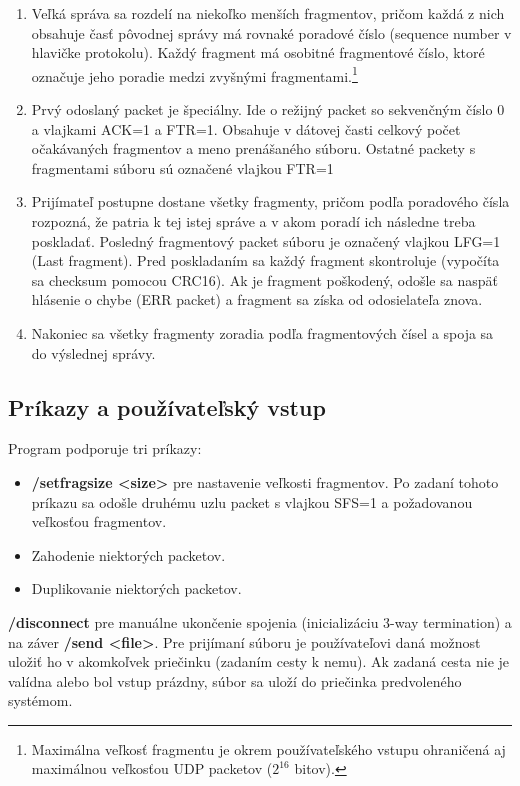 \documentclass[a4paper,12pt]{article}
\begin{document}
	\begin{enumerate}
		\item Veľká správa sa rozdelí na niekoľko menších fragmentov, pričom každá z nich obsahuje časť pôvodnej správy má rovnaké poradové číslo (sequence number v hlavičke protokolu). Každý fragment má osobitné fragmentové číslo, ktoré označuje jeho poradie medzi zvyšnými fragmentami.\footnote{Maximálna veľkosť fragmentu je okrem používateľského vstupu ohraničená aj maximálnou veľkosťou UDP packetov (${2}^{16}$ bitov).}
		\item Prvý odoslaný packet je špeciálny. Ide o režijný packet so sekvenčným číslo 0 a vlajkami ACK=1 a FTR=1. Obsahuje v dátovej časti celkový počet očakávaných fragmentov a meno prenášaného súboru. Ostatné packety s fragmentami súboru sú označené vlajkou FTR=1
		\item Prijímateľ postupne dostane všetky fragmenty, pričom podľa poradového čísla rozpozná, že patria k tej istej správe a v akom poradí ich následne treba poskladať. Posledný fragmentový packet súboru je označený vlajkou LFG=1 (Last fragment). Pred poskladaním sa každý fragment skontroluje (vypočíta sa checksum pomocou CRC16). Ak je fragment poškodený, odošle sa naspäť hlásenie o chybe (ERR packet) a fragment sa získa od odosielateľa znova.
		\item Nakoniec sa všetky fragmenty zoradia podľa fragmentových čísel a spoja sa do výslednej správy.
	\end{enumerate}
    
     \subsection{Príkazy a používateľský vstup}
	Program podporuje tri príkazy:
	\begin{itemize}
		\item \textbf{/setfragsize <size>} pre nastavenie veľkosti fragmentov. Po zadaní tohoto príkazu sa odošle druhému uzlu packet s vlajkou SFS=1 a požadovanou veľkosťou fragmentov.
		\item Zahodenie niektorých packetov.
		\item Duplikovanie niektorých packetov. 
	\end{itemize}
  
\textbf{/disconnect} pre manuálne ukončenie spojenia (inicializáciu 3-way termination) a na záver \textbf{/send <file>}. Pre prijímaní súboru je používateľovi daná možnost uložiť ho v akomkoľvek priečinku (zadaním cesty k nemu). Ak zadaná cesta nie je valídna alebo bol vstup prázdny, súbor sa uloží do priečinka predvoleného systémom.
\end{document}
